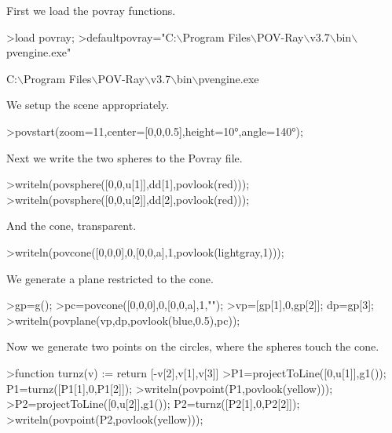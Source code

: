 \documentclass[a4paper,10pt]{article}
\begin{document}
\begin{eulernotebook}
\begin{eulercomment}
\begin{eulercomment}
\begin{eulercomment}
\begin{eulercomment}
\begin{eulercomment}
\begin{eulercomment}
\begin{eulercomment}
First we load the povray functions.
\end{eulercomment}
\begin{eulerprompt}
>load povray;
>defaultpovray="C:\(\backslash\)Program Files\(\backslash\)POV-Ray\(\backslash\)v3.7\(\backslash\)bin\(\backslash\)pvengine.exe"
\end{eulerprompt}
\begin{euleroutput}
  C:\(\backslash\)Program Files\(\backslash\)POV-Ray\(\backslash\)v3.7\(\backslash\)bin\(\backslash\)pvengine.exe
\end{euleroutput}
\begin{eulercomment}
We setup the scene appropriately.
\end{eulercomment}
\begin{eulerprompt}
>povstart(zoom=11,center=[0,0,0.5],height=10°,angle=140°);
\end{eulerprompt}
\begin{eulercomment}
Next we write the two spheres to the Povray file.
\end{eulercomment}
\begin{eulerprompt}
>writeln(povsphere([0,0,u[1]],dd[1],povlook(red)));
>writeln(povsphere([0,0,u[2]],dd[2],povlook(red)));
\end{eulerprompt}
\begin{eulercomment}
And the cone, transparent.
\end{eulercomment}
\begin{eulerprompt}
>writeln(povcone([0,0,0],0,[0,0,a],1,povlook(lightgray,1)));
\end{eulerprompt}
\begin{eulercomment}
We generate a plane restricted to the cone.
\end{eulercomment}
\begin{eulerprompt}
>gp=g();
>pc=povcone([0,0,0],0,[0,0,a],1,"");
>vp=[gp[1],0,gp[2]]; dp=gp[3];
>writeln(povplane(vp,dp,povlook(blue,0.5),pc));
\end{eulerprompt}
\begin{eulercomment}
Now we generate two points on the circles, where the spheres touch the
cone.
\end{eulercomment}
\begin{eulerprompt}
>function turnz(v) := return [-v[2],v[1],v[3]]
>P1=projectToLine([0,u[1]],g1()); P1=turnz([P1[1],0,P1[2]]);
>writeln(povpoint(P1,povlook(yellow)));
>P2=projectToLine([0,u[2]],g1()); P2=turnz([P2[1],0,P2[2]]);
>writeln(povpoint(P2,povlook(yellow)));
\end{eulerprompt}

\end{eulercomment}
\end{eulercomment}
\end{eulercomment}
\end{eulercomment}
\end{eulercomment}
\end{eulercomment}
\end{eulernotebook}
\end{document}
